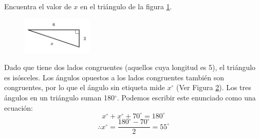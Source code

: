 Encuentra el valor de $x$ en el triángulo de la figura \ref{fig:lados_pitagoras_21}.

\begin{minipage}[t][][t]{0.35\textwidth}
    \begin{figure}[H]
        \centering
        \includegraphics[width=0.3\textwidth]{../images/lados_pitagoras_21.png}

        \caption{}
        \label{fig:lados_pitagoras_21}
    \end{figure}
\end{minipage}\hfill
\begin{minipage}[t][][t]{0.6\textwidth}
    \begin{solutionbox}{8cm}
        \begin{minipage}{0.3\textwidth}
            \begin{figure}[H]
                \centering
                \caption{}
                \label{fig:findangle10a}
            \end{figure}
        \end{minipage}\hfill
        \begin{minipage}{0.65\textwidth}
            Dado que tiene dos lados congruentes (aquellos cuya longitud es 5), el triángulo es isósceles. Los ángulos opuestos a los lados congruentes también son congruentes, por lo que el ángulo sin etiqueta mide $x^\circ$ (Ver Figura \ref{fig:findangle10a}).
            Los tres ángulos en un triángulo suman 180$^\circ$. Podemos escribir este enunciado como una ecuación:
            \[x^\circ + x^\circ + 70^\circ = 180^\circ \]
            \[\therefore x^\circ = \dfrac{180^\circ - 70^\circ}{2}  = 55^\circ\]
        \end{minipage}
    \end{solutionbox}
\end{minipage}
